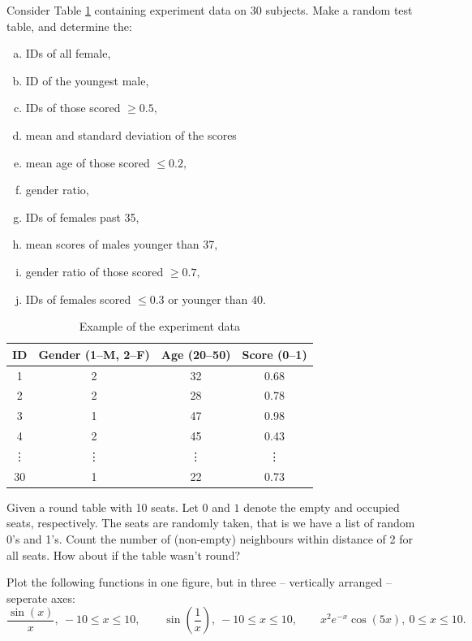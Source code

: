 \documentclass[a4paper, fleqn, 10pt]{report}
\theoremstyle{definition}
\newenvironment{prb*}[1]
  {\renewcommand\theprb{\thechapter.\arabic{prb}\rlap{$^{#1}$}}\prb}
  {\endprb}
\begin{document}
\begin{prb*}{3}
Consider Table \ref{tab:experiment} containing experiment data on 30 subjects.
Make a random test table, and determine the:
\begin{multicols}{2}
\begin{enumerate}[a)]
 \item IDs of all female,
 \item ID of the youngest male,
 \item IDs of those scored $\ge0.5,$
 \item mean and standard deviation of the scores
 \item mean age of those scored $\le 0.2,$
 \item gender ratio,
 \item IDs of females past 35,
 \item mean scores of males younger than 37,
 \item gender ratio of those scored $\ge 0.7,$
 \item IDs of females scored $\le 0.3$ or younger than $40.$
\end{enumerate}
\end{multicols}
\begin{table}[ht!]
\centering
\begin{tabular}{cccc}
\toprule
 ID & Gender (1--M, 2--F) & Age (20--50) & Score (0--1)\\
 \midrule
 1  & 2 & 32 & 0.68\\
 2  & 2 & 28 & 0.78\\
 3  & 1 & 47 & 0.98\\
 4  & 2 & 45 & 0.43\\
 \vdots & \vdots & \vdots & \vdots\\[0.5em]
 30  & 1 & 22 & 0.73\\
 \bottomrule
\end{tabular}
\caption{Example of the experiment data}\label{tab:experiment}
\end{table}
\end{prb*}

\begin{prb*}{3}
Given a round table with 10 seats.
Let $0$ and $1$ denote the empty and occupied seats, respectively.
The seats are randomly taken, that is we have a list of random 0's and 1's.
Count the number of (non-empty) neighbours within distance of 2 for all seats.
How about if the table wasn't round?
\end{prb*}


\begin{prb*}{3}
Plot the following functions in one figure, but in three -- vertically arranged -- seperate axes:
 \[ \frac{\sin(x)}{x},\: -10\le x\le 10, \qquad \sin\left(\frac{1}{x}\right),\: -10\le x\le 10, \qquad x^2e^{-x}\cos(5x),\: 0\le x\le 10.\]
\end{prb*}
\end{document}

